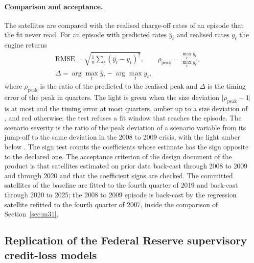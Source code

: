 \paragraph{Comparison and acceptance.}
The satellites are compared with the realised charge-off rates of an episode that the fit never read. For an episode with
predicted rates $\hat y_t$ and realised rates $y_t$ the engine returns
\begin{equation}
\begin{gathered}
\mathrm{RMSE}=\sqrt{\tfrac1n\sum_t(\hat y_t-y_t)^{2}},\qquad
\rho_{\mathrm{peak}}=\frac{\max_t\hat y_t}{\max_t y_t},\\
\Delta=\arg\max_t\hat y_t-\arg\max_t y_t,
\end{gathered}
\label{eq:st-backcast}
\end{equation}
where $\rho_{\mathrm{peak}}$ is the ratio of the predicted to the realised peak and $\Delta$ is the timing error of the peak in
quarters. The light is green when the size deviation $\lvert\rho_{\mathrm{peak}}-1\rvert$ is at most {\agstPeakAmber} and the
timing error at most {\agstTimingQuarters} quarters, amber up to a size deviation of {\agstPeakRed}, and red otherwise; the test
refuses a fit window that reaches the episode. The scenario severity is the ratio of the peak deviation of a scenario variable
from its jump-off to the same deviation in the 2008 to 2009 crisis, with the light amber below {\agstSevMin}. The sign test
counts the coefficients whose estimate has the sign opposite to the declared one. The acceptance criterion of the design document of the product is that
satellites estimated on prior data back-cast through 2008 to 2009 and through 2020 and that the coefficient signs are checked.
The committed satellites of the baseline are fitted to the fourth quarter of 2019 and back-cast through 2020 to 2025; the 2008 to
2009 episode is back-cast by the regression satellite refitted to the fourth quarter of 2007, inside the comparison of
Section~\ref{sec:m31}.

\subsection{Replication of the Federal Reserve supervisory credit-loss models}
\label{sec:m27}

